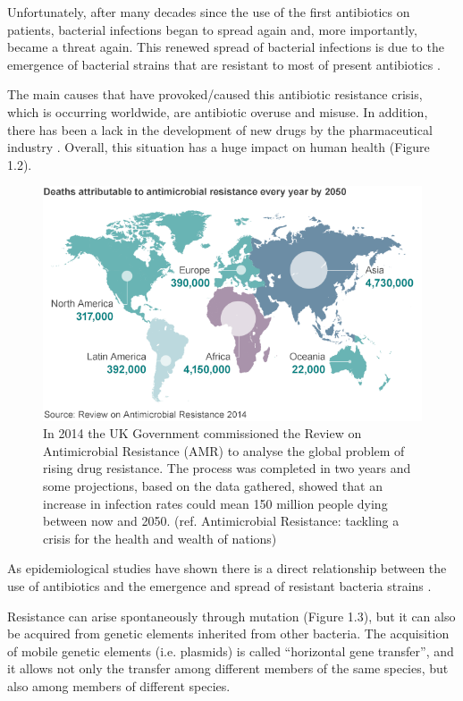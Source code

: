 \documentclass[11pt]{report}
\begin{document}
Unfortunately, after many decades since the use of the first antibiotics on patients, bacterial infections began to spread again and, more importantly, became a threat again.
This renewed spread of bacterial infections is due to the emergence of bacterial strains that are resistant to most of present antibiotics \cite{ventola2015antibiotic}.

The main causes that have provoked/caused this antibiotic resistance crisis, which is occurring worldwide, are antibiotic overuse and misuse.
In addition, there has been a lack in the development of new drugs by the pharmaceutical industry \cite{nature2013}.
Overall, this situation has a huge impact on human health (Figure 1.2).

\begin{figure}[htp]
\centering
\includegraphics[scale=0.80]{immagini gamalero/Antimicrobial_Spread2050.png}
\caption{In 2014 the UK Government commissioned the Review on Antimicrobial Resistance (AMR) to analyse the global problem of rising drug resistance. The process was completed in two years and some projections, based on the data gathered, showed that an increase in infection rates could mean 150 million people dying between now and 2050. (ref. Antimicrobial Resistance: tackling a crisis for the health and wealth of nations)}
\label{}
\end{figure}

As epidemiological studies have shown there is a direct relationship between the use of antibiotics and the emergence and spread of resistant bacteria strains \cite{huttner2013antimicrobial}.

Resistance can arise spontaneously through mutation (Figure 1.3), but it can also be acquired from genetic elements inherited from other bacteria.
The acquisition of mobile genetic elements (i.e. plasmids) is called “horizontal gene transfer”, and it allows not only the transfer among different members of the same species, but also among members of different species.
\end{document}
